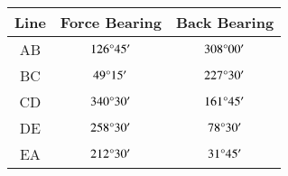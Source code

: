 \begin{tabular}[12pt]{ |c| c| c|}
    \hline
    Line & Force Bearing & Back Bearing\\
    \hline
    AB & $126\degree 45^{\prime}$ & $308\degree 00^{\prime}$\\
    \hline
    BC & $49\degree 15^{\prime}$ & $227\degree 30^{\prime}$\\
    \hline
    CD & $340\degree 30^{\prime}$ & $161\degree 45^{\prime}$\\
    \hline
    DE & $258\degree 30^{\prime}$ & $78\degree 30^{\prime}$\\
    \hline
    EA & $212\degree 30^{\prime}$ & $31\degree 45^{\prime}$\\
    \hline
\end{tabular}